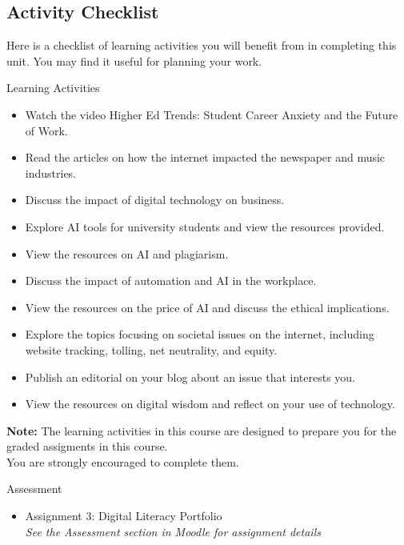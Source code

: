 \documentclass[
]{book}
\providecommand{\tightlist}{%
  \setlength{\itemsep}{0pt}\setlength{\parskip}{0pt}}
\theoremstyle{definition}
\theoremstyle{definition}
\theoremstyle{definition}
\theoremstyle{definition}
\theoremstyle{remark}
\begin{document}
\hypertarget{activity-checklist-5}{%
\subsection*{Activity Checklist}\label{activity-checklist-5}}

Here is a checklist of learning activities you will benefit from in completing this unit. You may find it useful for planning your work.

\begin{reflect}
{Learning Activities}

\begin{itemize}
\tightlist
\item
  Watch the video Higher Ed Trends: Student Career Anxiety and the Future of Work.
\item
  Read the articles on how the internet impacted the newspaper and music industries.
\item
  Discuss the impact of digital technology on business.
\item
  Explore AI tools for university students and view the resources provided.
\item
  View the resources on AI and plagiarism.
\item
  Discuss the impact of automation and AI in the workplace.
\item
  View the resources on the price of AI and discuss the ethical implications.
\item
  Explore the topics focusing on societal issues on the internet, including website tracking, tolling, net neutrality, and equity.
\item
  Publish an editorial on your blog about an issue that interests you.
\item
  View the resources on digital wisdom and reflect on your use of technology.
\end{itemize}

\textbf{Note:} The learning activities in this course are designed to prepare you for the graded assigments in this course.\\
You are strongly encouraged to complete them.
\end{reflect}

\begin{assessment}
{Assessment}

\begin{itemize}
\tightlist
\item
  Assignment 3: Digital Literacy Portfolio\\
  \emph{See the Assessment section in Moodle for assignment details}
\end{itemize}
\end{assessment}
\end{document}
